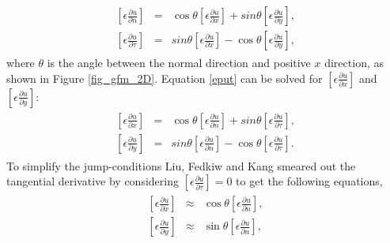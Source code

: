\begin{eqnarray}
\begin{aligned}
			\left[\epsilon \frac{\partial u}{\partial n}\right] &=& \cos \theta \left[\epsilon \frac{\partial u}{\partial x}\right] + sin \theta \left[\epsilon \frac{\partial u}{\partial y}\right],\label{epun} \\
			\left[\epsilon \frac{\partial u}{\partial \tau}\right] &=& sin \theta \left[\epsilon \frac{\partial u}{\partial x}\right] - \cos \theta\left[\epsilon \frac{\partial u}{\partial y}\right],\label{eput}	
\end{aligned}		
\end{eqnarray}
where $\theta$ is the angle between the normal direction and positive $x$ direction, as shown in Figure \ref{fig_gfm_2D}. 
Equation \ref{eput} can be solved for $ \left[\epsilon \frac{\partial u}{\partial x}\right]$ and $\left[\epsilon \frac{\partial u}{\partial y}\right]$:
\begin{eqnarray}
\begin{aligned}
	\left[\epsilon \frac{\partial u}{\partial x}\right] &=& \cos \theta \left[\epsilon \frac{\partial u}{\partial n}\right] +sin \theta \left[\epsilon \frac{\partial u}{\partial \tau}\right],\label{epux1} \\
	\left[\epsilon \frac{\partial u}{\partial y}\right] &=& sin \theta \left[\epsilon \frac{\partial u}{\partial n}\right] -\cos \theta \left[\epsilon \frac{\partial u}{\partial \tau}\right].\label{epuy1}
\end{aligned}	
\end{eqnarray}
To simplify the jump-conditions Liu, Fedkiw and Kang \cite{Liu2000}  smeared out the tangential derivative by considering $\left[\epsilon \frac{\partial u}{\partial \tau}\right]=0$ to get the following equations, 
\begin{eqnarray}
\begin{aligned}
	\left[\epsilon \frac{\partial u}{\partial x}\right] &\approx& \cos \theta \left[\epsilon \frac{\partial u}{\partial n}\right],\label{epux2}   \\
	\left[\epsilon \frac{\partial u}{\partial y}\right] &\approx& \sin \theta \left[\epsilon \frac{\partial u}{\partial n}\right], \label{epuy2}
\end{aligned}	
\end{eqnarray}
